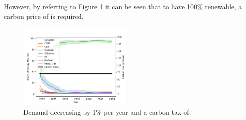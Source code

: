However, by referring to Figure \ref{fig:demand99carbon70} it can be seen that to have 100\% renewable, a carbon price of  is required. 

\begin{figure}[h]
	\begin{center}
		\includegraphics[width=0.5\textwidth]{figures/scenarios/demand099-carbon70-datetime.png}
		\caption{Demand decreasing by 1\% per year and a carbon tax of }
		\label{fig:demand99carbon70}
	\end{center}
\end{figure}



